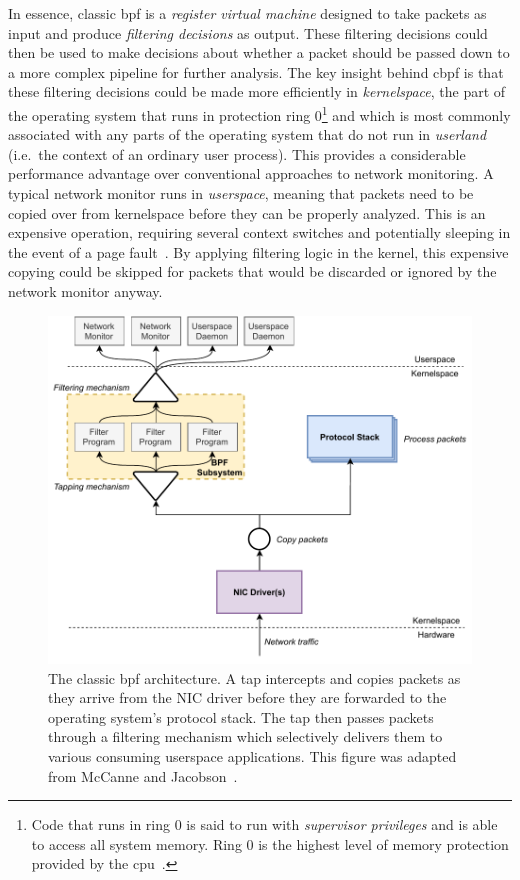 In essence, classic \gls{bpf} is a \textit{register virtual machine} designed to take packets as
input and produce \textit{filtering decisions} as output. These filtering decisions could
then be used to make decisions about whether a packet should be passed down to a more complex
pipeline for further analysis. The key insight behind \gls{cbpf} is that these filtering
decisions could be made more efficiently in \textit{kernelspace}, the part of the
operating system that runs in protection ring 0\footnote{Code that runs in ring 0 is said
to run with \textit{supervisor privileges} and is able to access all system memory. Ring
0 is the highest level of memory protection provided by the \gls{cpu}~\cite{jaeger2008_os_security}.}
and which is most commonly associated with any parts of the operating system that do not
run in \textit{userland} (i.e.\ the context of an ordinary user process). This provides
a considerable performance advantage over conventional approaches to network monitoring.
A typical network monitor runs in \textit{userspace}, meaning that packets need to be
copied over from kernelspace before they can be properly analyzed. This is an expensive
operation, requiring several context switches and potentially sleeping in the event of
a page fault~\cite{mccanne1993_bpf}.  By applying filtering logic in the kernel, this
expensive copying could be skipped for packets that would be discarded or ignored by the
network monitor anyway.

\begin{figure}[htbp]
  \centering
  \includegraphics[width=0.8\linewidth]{figs/background/classic-bpf.pdf}
  \caption[The classic BPF architecture]{
    The classic \gls{bpf} architecture.  A tap intercepts and copies packets as they
    arrive from the NIC driver before they are forwarded to the operating system's
    protocol stack.  The tap then passes packets through a filtering mechanism which
    selectively delivers them to various consuming userspace applications.  This figure
    was adapted from McCanne and Jacobson~\cite{mccanne1993_bpf}.
  }%
  \label{fig:classic-bpf}
\end{figure}

